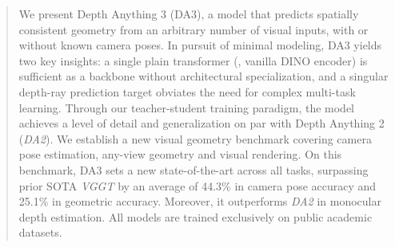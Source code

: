 \begin{abstract}
We present Depth Anything 3 (DA3), a model that predicts spatially consistent geometry from an arbitrary number of visual inputs, with or without known camera poses. 
In pursuit of minimal modeling, DA3 yields two key insights:
a single plain transformer (\eg, vanilla DINO encoder) is sufficient as a backbone without architectural specialization, and a singular depth-ray prediction target obviates the need for complex multi-task learning. Through our teacher-student training paradigm, the model achieves a level of detail and generalization on par with Depth Anything 2 (\textit{DA2}).
We establish a new visual geometry benchmark covering camera pose estimation, any-view geometry and visual rendering. On this benchmark, DA3 sets a new state-of-the-art across all tasks, surpassing prior SOTA \textit{VGGT} by an average of 44.3\% in camera pose accuracy and 25.1\% in geometric accuracy. Moreover, it outperforms \textit{DA2} in monocular depth estimation. All models are trained exclusively on public academic datasets.
\end{abstract}